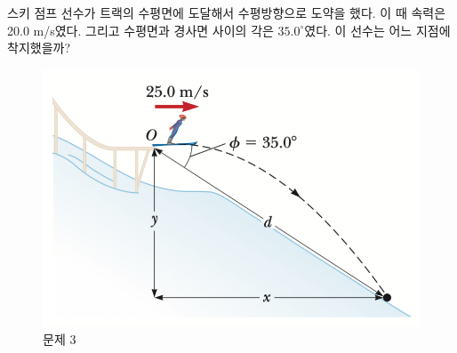 \documentclass[floatfix,nofootinbib,superscriptaddress,fleqn,preprint]{revtex4}
\begin{document}
\vspace{2cm}

스키 점프 선수가 트랙의 수평면에 도달해서
수평방향으로 도약을 했다. 이 때 속력은 20.0 m/s였다. 그리고 수평면과
경사면 사이의 각은 $35.0^\circ$였다. 이 선수는 어느 지점에 착지했을까? 
\begin{figure}[ht]
  \centering
\includegraphics[scale=0.6]{Qfig4-3.pdf}  
  \caption{문제 3}
  \label{fig:2}
\end{figure}



\vspace{2cm}
\end{document}
